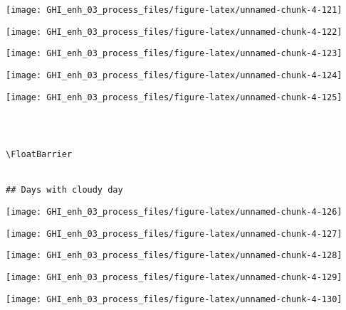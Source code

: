 \documentclass[
  10pt,
  a4paper,oneside]{article}
\begin{document}
\begin{center}\texttt{[image: GHI\_enh\_03\_process\_files/figure-latex/unnamed-chunk-4-121]} \end{center}

\begin{center}\texttt{[image: GHI\_enh\_03\_process\_files/figure-latex/unnamed-chunk-4-122]} \end{center}

\begin{center}\texttt{[image: GHI\_enh\_03\_process\_files/figure-latex/unnamed-chunk-4-123]} \end{center}

\begin{center}\texttt{[image: GHI\_enh\_03\_process\_files/figure-latex/unnamed-chunk-4-124]} \end{center}

\begin{center}\texttt{[image: GHI\_enh\_03\_process\_files/figure-latex/unnamed-chunk-4-125]} \end{center}

\begin{verbatim}
 
 

\FloatBarrier


## Days with cloudy day 
\end{verbatim}

\begin{center}\texttt{[image: GHI\_enh\_03\_process\_files/figure-latex/unnamed-chunk-4-126]} \end{center}

\begin{center}\texttt{[image: GHI\_enh\_03\_process\_files/figure-latex/unnamed-chunk-4-127]} \end{center}

\begin{center}\texttt{[image: GHI\_enh\_03\_process\_files/figure-latex/unnamed-chunk-4-128]} \end{center}

\begin{center}\texttt{[image: GHI\_enh\_03\_process\_files/figure-latex/unnamed-chunk-4-129]} \end{center}

\begin{center}\texttt{[image: GHI\_enh\_03\_process\_files/figure-latex/unnamed-chunk-4-130]} \end{center}
\end{document}
